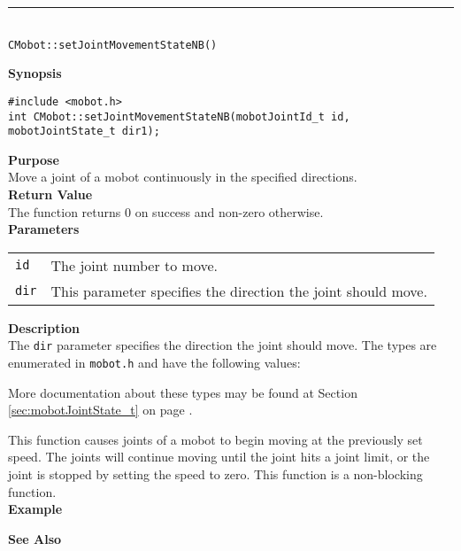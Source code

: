 \noindent
\vspace{5pt}
\rule{4.5in}{0.015in}\\
\noindent
{\LARGE \texttt{CMobot::setJointMovementStateNB()}}\\
{}

\noindent
{\bf Synopsis}
\vspace{-8pt}
\begin{verbatim}
#include <mobot.h>
int CMobot::setJointMovementStateNB(mobotJointId_t id, mobotJointState_t dir1);
\end{verbatim}

\noindent
{\bf Purpose}\\
Move a joint of a mobot continuously in the specified directions.\\

\noindent
{\bf Return Value}\\
The function returns 0 on success and non-zero otherwise.\\

\noindent
{\bf Parameters}\\
\vspace{-0.1in}
\begin{description}
\item               
\begin{tabular}{p{10 mm}p{145 mm}}
\texttt{id} & The joint number to move. \\
\texttt{dir} &  
This parameter specifies the direction the joint should move. \\
\end{tabular}
\end{description}

\noindent
{\bf Description}\\
The \texttt{dir} parameter specifies the direction the joint should move.
The types
are enumerated in \texttt{mobot.h} and have the following values:

More documentation about these types may be found at Section
\ref{sec:mobotJointState_t} on page
\pageref{sec:mobotJointState_t}.  

This function causes joints of a mobot to begin moving at the previously set
speed. The joints will continue moving until the joint hits a joint limit, or
the joint is stopped by setting the speed to zero. This function is a non-blocking
function.\\

\noindent
{\bf Example}\\
\noindent

\noindent
{\bf See Also}\\

